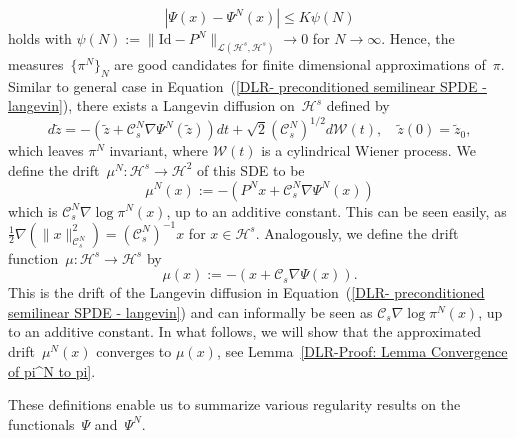 \begin{equation*}
 | \Psi (x) - \Psi^N (x) | \leq K \psi(N) 
\end{equation*}
holds with $\psi(N) := \| \text{Id} - P^N \|_{\mathcal{L}(\mathcal{H}^s, \mathcal{H}^s)} \to 0$ for $N \to \infty$. Hence, the measures~$\{ \pi^N \}_N$ are good candidates for finite dimensional approximations of~$\pi$. Similar to general case in Equation~(\ref{DLR- preconditioned semilinear SPDE - langevin}), there exists a Langevin diffusion on~$\mathcal{H}^s$ defined by
\begin{equation}
 d \tilde{z} = - ( \tilde{z} + \mathcal{C}_s^N \nabla \Psi^N (\tilde{z}) ) dt + \sqrt{2} (\mathcal{C}_s^N)^{1/2} d \mathcal{W}(t), \quad \tilde{z}(0) = \tilde{z}_0,
\end{equation}
which  leaves $ \pi^{N} $ invariant, where $\mathcal{W}(t)$ is a cylindrical Wiener process. We define the drift~$\mu^N: \mathcal{H}^s \to \mathcal{H}^2$ of this SDE to be
\begin{equation}
\label{DLR-Setting: Definition aproximated drift mu^N}
 \mu^N (x) := - \left(  P^N x + \mathcal{C}_s^N \nabla \Psi^N (x)  \right)
\end{equation}
which is $ \mathcal{C}_s^{N} \nabla \log \pi^{N} (x) $, up to an additive constant. This can be seen easily, as $ \tfrac{1}{2}  \nabla \left( \| x \|_{\mathcal{C}_s^N}^2 \right) = (\mathcal{C}_s^N)^{-1} x  $ for $x \in \mathcal{H}^s$. Analogously, we define the drift function~$\mu : \mathcal{H}^s \to \mathcal{H}^s$ by
\begin{equation}
\label{DLR-Setting: Definition drift mu}
 \mu(x) := - (x + \mathcal{C}_s \nabla \Psi (x) ).
\end{equation}
This is the drift of the Langevin diffusion in Equation~(\ref{DLR- preconditioned semilinear SPDE - langevin}) and can informally be seen as  $ \mathcal{C}_s \nabla \log \pi^{N} (x) $, up to an additive constant. In what follows, we will show that the approximated drift~$\mu^N(x)$ converges to $\mu(x)$, see Lemma~\ref{DLR-Proof: Lemma Convergence of pi^N to pi}.

These definitions enable us to summarize various regularity results on the functionals~$\Psi$ and~$\Psi^N$.

